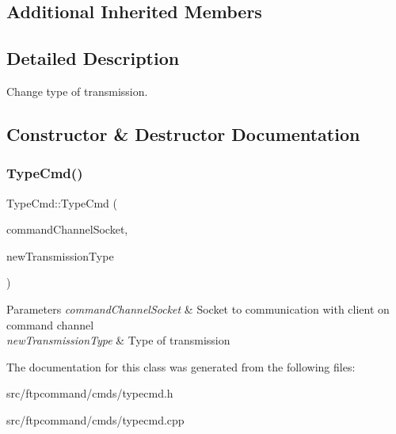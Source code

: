 \subsection*{Additional Inherited Members}


\subsection{Detailed Description}
Change type of transmission. 

\subsection{Constructor \& Destructor Documentation}
\mbox{\label{classTypeCmd_a33586ed2ac513ef510cb523044558d1a}} 
\subsubsection{\texorpdfstring{Type\+Cmd()}{TypeCmd()}}
{\footnotesize\ttfamily Type\+Cmd\+::\+Type\+Cmd (\begin{DoxyParamCaption}\item[{int}]{command\+Channel\+Socket,  }\item[{Account\+Info\+::\+Transmission\+Type}]{new\+Transmission\+Type }\end{DoxyParamCaption})}


\begin{DoxyParams}{Parameters}
{\em command\+Channel\+Socket} & Socket to communication with client on command channel \\
\hline
{\em new\+Transmission\+Type} & Type of transmission \\
\hline
\end{DoxyParams}


The documentation for this class was generated from the following files\+:\begin{DoxyCompactItemize}
\item 
src/ftpcommand/cmds/typecmd.\+h\item 
src/ftpcommand/cmds/typecmd.\+cpp\end{DoxyCompactItemize}
